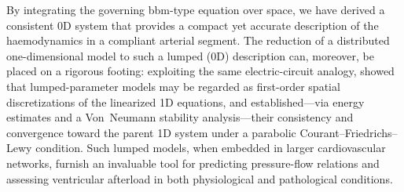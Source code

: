 \documentclass[alpha-refs, 12pt]{wiley-article}
\begin{document}
By integrating the governing \acrshort{bbm}-type equation over space, we have derived a consistent 0D system that provides a compact yet accurate description of the haemodynamics in a compliant arterial segment. The reduction of a distributed one-dimensional model to such a lumped (0D) description can, moreover, be placed on a rigorous footing: exploiting the same electric-circuit analogy, \citet{Milisic2004} showed that lumped-parameter models may be regarded as first-order spatial discretizations of the linearized 1D equations, and established---via energy estimates and a Von~Neumann stability analysis---their consistency and convergence toward the parent 1D system under a parabolic Courant--Friedrichs--Lewy condition. Such lumped models, when embedded in larger cardiovascular networks, furnish an invaluable tool for predicting pressure-flow relations and assessing ventricular afterload in both physiological and pathological conditions.
\end{document}
